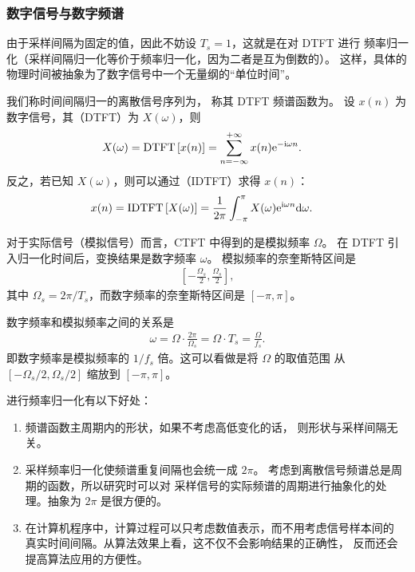 \subsubsection{数字信号与数字频谱}

由于采样间隔为固定的值，因此不妨设 $T_s = 1$，这就是在对 DTFT 进行
频率归一化（采样间隔归一化等价于频率归一化，因为二者是互为倒数的）。
这样，具体的物理时间被抽象为了数字信号中一个无量纲的``单位时间''。

\begin{definition}[离散时间傅里叶变换]
    我们称时间间隔归一的离散信号序列为，
    称其 DTFT 频谱函数为。
    设 $x(n)$ 为数字信号，其（DTFT）为 $X(\omega)$，则
    \begin{align*}
        X(\omega) & = \mathrm{DTFT}\left[x(n)\right] = \sum_{n = -\infty}^{+\infty}x(n)\mathrm{e}^{-\mathrm{i}\omega n}.
    \end{align*}
    反之，若已知 $X(\omega)$，则可以通过（IDTFT）求得 $x(n)$：
    \begin{align*}
        x(n) & = \mathrm{IDTFT}\left[X(\omega)\right] = \frac{1}{2\pi}\int_{-\pi}^{\pi}X(\omega)\mathrm{e}^{\mathrm{i}\omega n}\mathrm{d}\omega.
    \end{align*}
\end{definition}

\begin{remark}
    对于实际信号（模拟信号）而言，CTFT 中得到的是模拟频率 $\Omega$。
    在 DTFT 引入归一化时间后，变换结果是数字频率 $\omega$。
    模拟频率的奈奎斯特区间是
    \begin{align*}
        \left[-\frac{\Omega_s}{2}, \frac{\Omega_s}{2}\right],
    \end{align*}
    其中 $\Omega_s = 2\pi/T_s$，而数字频率的奈奎斯特区间是 $[-\pi, \pi]$。

    数字频率和模拟频率之间的关系是
    \begin{align*}
        \omega = \Omega \cdot \frac{2\pi}{\Omega_s} = \Omega \cdot T_s = \frac{\Omega}{f_s}.
    \end{align*}
    即数字频率是模拟频率的 $1/f_s$ 倍。这可以看做是将 $\Omega$ 的取值范围
    从 $[-\Omega_s/2, \Omega_s/2]$ 缩放到 $[-\pi, \pi]$。
\end{remark}

\begin{remark}
    进行频率归一化有以下好处：
    \begin{enumerate}[label=(\arabic*)]
        \item 频谱函数主周期内的形状，如果不考虑高低变化的话，
            则形状与采样间隔无关。
        \item 采样频率归一化使频谱重复间隔也会统一成 $2\pi$。
            考虑到离散信号频谱总是周期的函数，所以研究时可以对
            采样信号的实际频谱的周期进行抽象化的处理。抽象为 $2\pi$ 是很方便的。
        \item 在计算机程序中，计算过程可以只考虑数值表示，而不用考虑信号样本间的
            真实时间间隔。从算法效果上看，这不仅不会影响结果的正确性，
            反而还会提高算法应用的方便性。
    \end{enumerate}
\end{remark}

